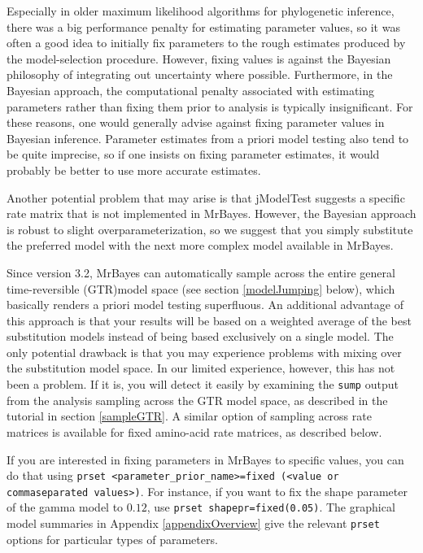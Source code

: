 \documentclass[12pt]{book}
\begin{document}
Especially in older maximum likelihood algorithms for phylogenetic inference, there was a big
performance penalty for estimating parameter values, so it was often a good idea to initially fix
parameters to the rough estimates produced by the model-selection procedure. However, fixing values
is against the Bayesian philosophy of integrating out uncertainty where possible. Furthermore, in
the Bayesian approach, the computational penalty associated with estimating parameters rather than
fixing them prior to analysis is typically insignificant. For these reasons, one would generally
advise against fixing parameter values in Bayesian inference. Parameter estimates from a priori
model testing also tend to be quite imprecise, so if one insists on fixing parameter estimates, it
would probably be better to use more accurate estimates.

Another potential problem that may arise is that jModelTest suggests a specific rate matrix that is
not implemented in MrBayes. However, the Bayesian approach is robust to slight
overparameterization, so we suggest that you simply substitute the preferred model with the next
more complex model available in MrBayes.

Since version 3.2, MrBayes can automatically sample across the entire general time-reversible
(GTR)model space (see section \ref{modelJumping} below), which basically renders a priori model
testing superfluous. An additional advantage of this approach is that your results will be based on
a weighted average of the best substitution models instead of being based exclusively on a single
model. The only potential drawback is that you may experience problems with mixing over the
substitution model space. In our limited experience, however, this has not been a problem. If it
is, you will detect it easily by examining the \texttt{sump} output from the analysis sampling
across the GTR model space, as described in the tutorial in section \ref{sampleGTR}. A similar
option of sampling across rate matrices is available for fixed amino-acid rate matrices, as
described below.

If you are interested in fixing parameters in MrBayes to specific values, you can do that using
\texttt{prset <parameter\_prior\_name>=fixed (<value or commaseparated values>)}. For instance, if
you want to fix the shape parameter of the gamma model to $0.12$, use \texttt{prset
shapepr=fixed(0.05)}. The graphical model summaries in Appendix \ref{appendixOverview} give the
relevant \texttt{prset} options for particular types of parameters.
\end{document}
